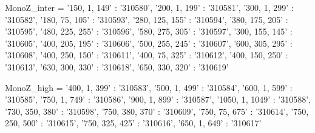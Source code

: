 MonoZ_inter = {'150, 1, 149' : '310580',
            '200, 1, 199' : '310581',
            '300, 1, 299' : '310582',
            '180, 75, 105' : '310593',
            '280, 125, 155' : '310594',
            '380, 175, 205' : '310595',
            '480, 225, 255' : '310596',
            '580, 275, 305' : '310597',
            '300, 155, 145' : '310605',
            '400, 205, 195' : '310606',
            '500, 255, 245' : '310607',
            '600, 305, 295' : '310608',
            '400, 250, 150' : '310611',
            '400, 75, 325' : '310612',
            '400, 150, 250' : '310613',
            '630, 300, 330' : '310618',
            '650, 330, 320' : '310619'}




MonoZ_high = {'400, 1, 399' : '310583',
             '500, 1, 499' : '310584',
             '600, 1, 599' : '310585',
             '750, 1, 749' : '310586',
             '900, 1, 899' : '310587',
             '1050, 1, 1049' : '310588',
             '730, 350, 380' : '310598',
             '750, 380, 370' : '310609',
             '750, 75, 675' : '310614',
             '750, 250, 500' : '310615',
             '750, 325, 425' : '310616',
             '650, 1, 649' : '310617'}







